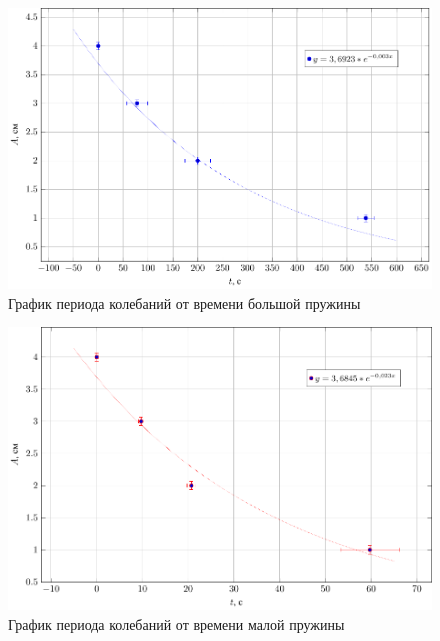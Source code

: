 \newpage
\begin{figure}[H]
	\centering
	\includegraphics[scale=1]{img/graph_5}
	\caption{График периода колебаний от времени большой пружины}
	\label{fig:ris3}
\end{figure}
\begin{figure}[H]
	\centering
	\includegraphics[scale=1]{img/graph_6}
	\caption{График периода колебаний от времени малой пружины}
	\label{fig:ris4}
\end{figure}
 





